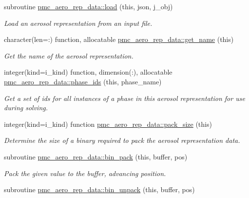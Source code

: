 \begin{DoxyCompactItemize}
\item 
subroutine \mbox{\hyperlink{namespacepmc__aero__rep__data_a4f60a8dbb71b08bbd779ca689bc92849}{pmc\+\_\+aero\+\_\+rep\+\_\+data\+::load}} (this, json, j\+\_\+obj)
\begin{DoxyCompactList}\small\item\em Load an aerosol representation from an input file. \end{DoxyCompactList}\item 
character(len=\+:) function, allocatable \mbox{\hyperlink{namespacepmc__aero__rep__data_a20e6255c5249c9fc6691e305676bb47c}{pmc\+\_\+aero\+\_\+rep\+\_\+data\+::get\+\_\+name}} (this)
\begin{DoxyCompactList}\small\item\em Get the name of the aerosol representation. \end{DoxyCompactList}\item 
integer(kind=i\+\_\+kind) function, dimension(\+:), allocatable \mbox{\hyperlink{namespacepmc__aero__rep__data_a794f04d2ea273b301cde815c52c73e01}{pmc\+\_\+aero\+\_\+rep\+\_\+data\+::phase\+\_\+ids}} (this, phase\+\_\+name)
\begin{DoxyCompactList}\small\item\em Get a set of ids for all instances of a phase in this aerosol representation for use during solving. \end{DoxyCompactList}\item 
integer(kind=i\+\_\+kind) function \mbox{\hyperlink{namespacepmc__aero__rep__data_a2f3aef419f1004c1ecebde0a448f415b}{pmc\+\_\+aero\+\_\+rep\+\_\+data\+::pack\+\_\+size}} (this)
\begin{DoxyCompactList}\small\item\em Determine the size of a binary required to pack the aerosol representation data. \end{DoxyCompactList}\item 
subroutine \mbox{\hyperlink{namespacepmc__aero__rep__data_a41ef8540357a012a2cddda626aab5bae}{pmc\+\_\+aero\+\_\+rep\+\_\+data\+::bin\+\_\+pack}} (this, buffer, pos)
\begin{DoxyCompactList}\small\item\em Pack the given value to the buffer, advancing position. \end{DoxyCompactList}\item 
subroutine \mbox{\hyperlink{namespacepmc__aero__rep__data_a67f039078092e889f0815368bbec4fa2}{pmc\+\_\+aero\+\_\+rep\+\_\+data\+::bin\+\_\+unpack}} (this, buffer, pos)

\end{DoxyCompactItemize}
